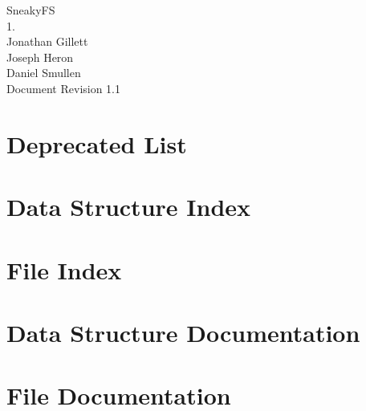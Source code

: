 \documentclass{book}
\begin{document}
\hypersetup{pageanchor=false,citecolor=blue}
\begin{titlepage}
\vspace*{7cm}
\begin{center}
{\Large Sneaky\-F\-S \\[1ex]\large 1. }\\
\vspace*{1.0cm}
{\large Jonathan Gillett \\ Joseph Heron \\[0.10cm] Daniel Smullen}\\
\vspace*{0.5cm}
{\small Document Revision 1.1}\\
\end{center}
\end{titlepage}
\clearemptydoublepage
{}
\tableofcontents
\clearemptydoublepage
{}
\hypersetup{pageanchor=true,citecolor=blue}
\chapter{Deprecated List}
\label{deprecated}
\hypertarget{deprecated}{}

\chapter{Data Structure Index}

\chapter{File Index}

\chapter{Data Structure Documentation}







\chapter{File Documentation}












































\printindex
\end{document}
